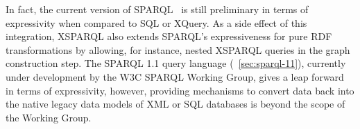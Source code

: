 In fact, the current version of SPARQL~\cite{PrudhommeauxSeaborne:2008aa} is still preliminary in terms of expressivity
when compared to SQL or XQuery.
%
As a side effect of this integration, XSPARQL also extends SPARQL's expressiveness for pure \ac{RDF} transformations by
allowing, for instance, nested XSPARQL queries in the graph construction step.
%
The SPARQL 1.1 query language (\cf~\cref{sec:sparql-11}), currently under development by the W3C SPARQL Working
Group, gives a leap forward in terms of expressivity, however, providing mechanisms to convert data back into the native
legacy data models of \ac{XML} or SQL databases is beyond the scope of the Working Group.





